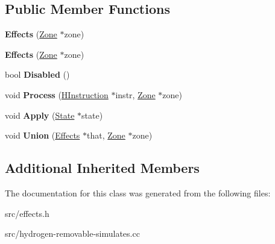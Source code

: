 \subsection*{Public Member Functions}
\begin{DoxyCompactItemize}
\item 
\hypertarget{classv8_1_1internal_1_1_effects_abf02ef877195c8d0045fd0b9e694c4bf}{}{\bfseries Effects} (\hyperlink{classv8_1_1internal_1_1_zone}{Zone} $\ast$zone)\label{classv8_1_1internal_1_1_effects_abf02ef877195c8d0045fd0b9e694c4bf}

\item 
\hypertarget{classv8_1_1internal_1_1_effects_abf02ef877195c8d0045fd0b9e694c4bf}{}{\bfseries Effects} (\hyperlink{classv8_1_1internal_1_1_zone}{Zone} $\ast$zone)\label{classv8_1_1internal_1_1_effects_abf02ef877195c8d0045fd0b9e694c4bf}

\item 
\hypertarget{classv8_1_1internal_1_1_effects_a96c11797850446c3efc68d8b1d549009}{}bool {\bfseries Disabled} ()\label{classv8_1_1internal_1_1_effects_a96c11797850446c3efc68d8b1d549009}

\item 
\hypertarget{classv8_1_1internal_1_1_effects_acef86469bea1fe2748eb2ddfe35cfba8}{}void {\bfseries Process} (\hyperlink{classv8_1_1internal_1_1_h_instruction}{H\+Instruction} $\ast$instr, \hyperlink{classv8_1_1internal_1_1_zone}{Zone} $\ast$zone)\label{classv8_1_1internal_1_1_effects_acef86469bea1fe2748eb2ddfe35cfba8}

\item 
\hypertarget{classv8_1_1internal_1_1_effects_a3ee94c927da461866aff23a3346674df}{}void {\bfseries Apply} (\hyperlink{classv8_1_1internal_1_1_state}{State} $\ast$state)\label{classv8_1_1internal_1_1_effects_a3ee94c927da461866aff23a3346674df}

\item 
\hypertarget{classv8_1_1internal_1_1_effects_a21244823e081f2fefaea4bdbd2375a0b}{}void {\bfseries Union} (\hyperlink{classv8_1_1internal_1_1_effects}{Effects} $\ast$that, \hyperlink{classv8_1_1internal_1_1_zone}{Zone} $\ast$zone)\label{classv8_1_1internal_1_1_effects_a21244823e081f2fefaea4bdbd2375a0b}

\end{DoxyCompactItemize}
\subsection*{Additional Inherited Members}


The documentation for this class was generated from the following files\+:\begin{DoxyCompactItemize}
\item 
src/effects.\+h\item 
src/hydrogen-\/removable-\/simulates.\+cc\end{DoxyCompactItemize}
